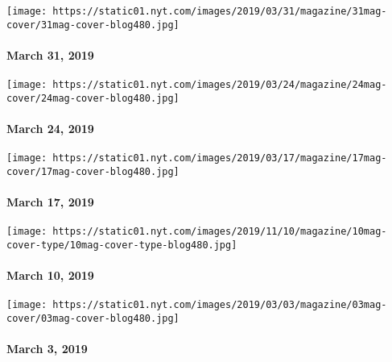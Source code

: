 \href{https://www.nytimes.com/issue/magazine/2019/03/29/the-33119-issue}{}

\texttt{[image: https://static01.nyt.com/images/2019/03/31/magazine/31mag-cover/31mag-cover-blog480.jpg]}

\hypertarget{march-31-2019}{%
\paragraph{March 31, 2019}\label{march-31-2019}}

\href{https://www.nytimes.com/issue/magazine/2019/03/22/the-032419-issue}{}

\texttt{[image: https://static01.nyt.com/images/2019/03/24/magazine/24mag-cover/24mag-cover-blog480.jpg]}

\hypertarget{march-24-2019}{%
\paragraph{March 24, 2019}\label{march-24-2019}}

\href{https://www.nytimes.com/issue/magazine/2019/03/15/the-31719-issue}{}

\texttt{[image: https://static01.nyt.com/images/2019/03/17/magazine/17mag-cover/17mag-cover-blog480.jpg]}

\hypertarget{march-17-2019}{%
\paragraph{March 17, 2019}\label{march-17-2019}}

\href{https://www.nytimes.com/interactive/2019/03/07/magazine/top-songs.html}{}

\texttt{[image: https://static01.nyt.com/images/2019/11/10/magazine/10mag-cover-type/10mag-cover-type-blog480.jpg]}

\hypertarget{march-10-2019}{%
\paragraph{March 10, 2019}\label{march-10-2019}}

\href{https://www.nytimes.com/issue/magazine/2019/03/01/the-322019-issue}{}

\texttt{[image: https://static01.nyt.com/images/2019/03/03/magazine/03mag-cover/03mag-cover-blog480.jpg]}

\hypertarget{march-3-2019}{%
\paragraph{March 3, 2019}\label{march-3-2019}}

